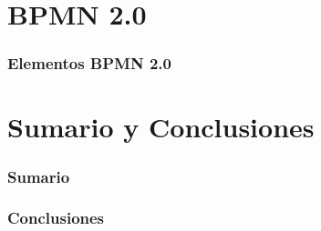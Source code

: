 \documentclass[a4paper,slidestop,xcolor=pst,blue]{beamer}
\begin{document}




\section{BPMN 2.0}


\begin{frame}[c]
    \frametitle{Elementos BPMN 2.0}
\end{frame}



\section{Sumario y Conclusiones}

\begin{frame}[c]
    \frametitle{Sumario}
\end{frame}

\begin{frame}[c]
    \frametitle{Conclusiones}
\end{frame}
\end{document}
